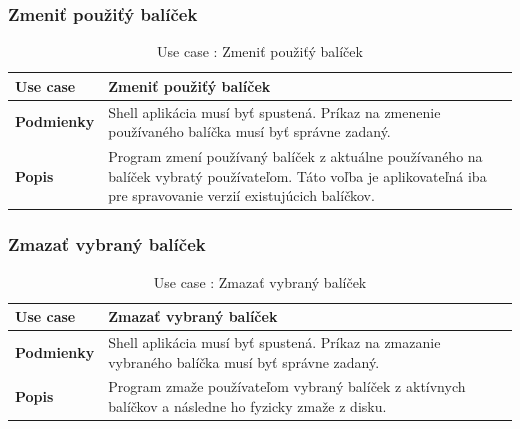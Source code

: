 \subsubsection{Zmeniť  použiťý balíček}
\begin{center}
	\begin{table}[htbp]
		\begin{tabular}{|p{2.5cm}|p{14cm}|}
			\hline
			\textbf{Use case} & Zmeniť  použiťý balíček \\ 
			\hline
			\textbf{Podmienky} & Shell aplikácia musí byť spustená. Príkaz na zmenenie používaného balíčka musí byť správne zadaný.\\ 
			\hline
			\textbf{Popis} & Program zmení používaný balíček z aktuálne používaného na balíček vybratý používateľom. Táto voľba je aplikovateľná iba pre spravovanie verzií existujúcich balíčkov. \\ 
			\hline
		\end{tabular}
		\label{table:1}
		\caption{Use case : Zmeniť  použiťý balíček}
	\end{table}
\end{center}
\newpage
\subsubsection{Zmazať vybraný balíček}
\begin{center}
	\begin{table}[htbp]
		\begin{tabular}{|p{2.5cm}|p{14cm}|}
			\hline
			\textbf{Use case} & Zmazať vybraný balíček \\ 
			\hline
			\textbf{Podmienky} & Shell aplikácia musí byť spustená. Príkaz na zmazanie vybraného balíčka musí byť správne zadaný.\\ 
			\hline
			\textbf{Popis} & Program zmaže používateľom vybraný balíček z aktívnych balíčkov a následne ho fyzicky zmaže z disku. \\ 
			\hline
		\end{tabular}
		\label{table:1}
		\caption{Use case : Zmazať vybraný balíček}
	\end{table}
\end{center}
